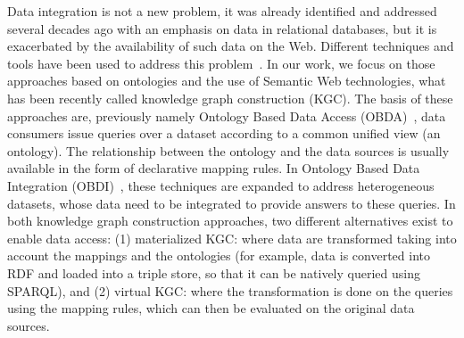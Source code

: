 Data integration is not a new problem, it was already identified and addressed several decades ago with an emphasis on data in relational databases, but it is exacerbated by the availability of such data on the Web. Different techniques and tools have been used to address this problem~\citep{Lenzerini02,Halevy18}. In our work, we focus on those approaches based on ontologies and the use of Semantic Web technologies, what has been recently called knowledge graph construction (KGC). The basis of these approaches are, previously namely Ontology Based Data Access (OBDA)~\citep{poggi2008linking}, data consumers issue queries over a dataset according to a common unified view (an ontology). The relationship between the ontology and the data sources is usually available in the form of declarative mapping rules. In Ontology Based Data Integration (OBDI)~\citep{poggi2008linking}, these techniques are expanded to address heterogeneous datasets, whose data need to be integrated to provide answers to these queries. In both knowledge graph construction approaches, two different alternatives exist to enable data access: (1) materialized KGC: where data are transformed taking into account the mappings and the ontologies (for example, data is converted into RDF and loaded into a triple store, so that it can be natively queried using SPARQL), and (2) virtual KGC: where the transformation is done on the queries using the mapping rules, which can then be evaluated on the original data sources. 


